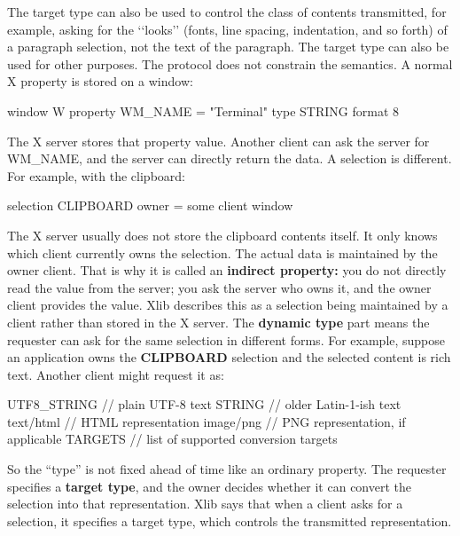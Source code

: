 \documentclass{report}
\begin{document}
\begin{itemize}
        \bigbreak \noindent 
        The target type can also be used to control the class of contents transmitted, for example, asking for the ‘‘looks’’ (fonts, line spacing, indentation, and so forth) of a paragraph selection, not the text of the paragraph. The target type can also be used for other purposes. The protocol does not constrain the semantics.
        \bigbreak \noindent 
        A normal X property is stored on a window:
        \bigbreak \noindent 
        \begin{cppcode}
        window W
          property WM_NAME = "Terminal"
          type STRING
          format 8
        \end{cppcode}
        \bigbreak \noindent 
        The X server stores that property value. Another client can ask the server for WM\_NAME, and the server can directly return the data.
        \bigbreak \noindent 
        A selection is different. For example, with the clipboard:
        \bigbreak \noindent 
        \begin{cppcode}
            selection CLIPBOARD
                owner = some client window
        \end{cppcode}
        \bigbreak \noindent 
        The X server usually does not store the clipboard contents itself. It only knows which client currently owns the selection. The actual data is maintained by the owner client. That is why it is called an \textbf{indirect property:} you do not directly read the value from the server; you ask the server who owns it, and the owner client provides the value. Xlib describes this as a selection being maintained by a client rather than stored in the X server.
        \bigbreak \noindent 
        The \textbf{dynamic type} part means the requester can ask for the same selection in different forms.
        \bigbreak \noindent 
        For example, suppose an application owns the \textbf{CLIPBOARD} selection and the selected content is rich text. Another client might request it as:
        \bigbreak \noindent 
        \begin{cppcode}
            UTF8_STRING      // plain UTF-8 text
            STRING           // older Latin-1-ish text
            text/html        // HTML representation
            image/png        // PNG representation, if applicable
            TARGETS          // list of supported conversion targets
        \end{cppcode}
        \bigbreak \noindent 
        So the “type” is not fixed ahead of time like an ordinary property. The requester specifies a \textbf{target type}, and the owner decides whether it can convert the selection into that representation. Xlib says that when a client asks for a selection, it specifies a target type, which controls the transmitted representation.

\end{itemize}
\end{document}
